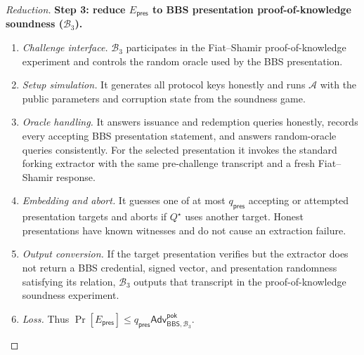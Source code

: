 \documentclass[letterpaper]{article}
\newcommand{\adv}{\mathcal{A}}
\newcommand{\bbs}{\mathsf{BBS}}
\newcommand{\Adv}{\mathsf{Adv}}
\begin{document}
\begin{proof}[Reduction]
\textbf{Step 3: reduce \(E_{\mathsf{pres}}\) to BBS presentation
proof-of-knowledge soundness (\(\mathcal B_3\)).}
\begin{enumerate}
  \item \emph{Challenge interface.} \(\mathcal B_3\) participates in the
  Fiat--Shamir proof-of-knowledge experiment and controls the random oracle
  used by the BBS presentation.
  \item \emph{Setup simulation.} It generates all protocol keys honestly and
  runs \(\adv\) with the public parameters and corruption state from the
  soundness game.
  \item \emph{Oracle handling.} It answers issuance and redemption queries
  honestly, records every accepting BBS presentation statement, and answers
  random-oracle queries consistently. For the selected presentation it invokes
  the standard forking extractor with the same pre-challenge transcript and a
  fresh Fiat--Shamir response.
  \item \emph{Embedding and abort.} It guesses one of at most
  \(q_{\mathsf{pres}}\) accepting or attempted presentation targets and aborts
  if \(Q^\star\) uses another target. Honest presentations have known witnesses
  and do not cause an extraction failure.
  \item \emph{Output conversion.} If the target presentation verifies but the
  extractor does not return a BBS credential, signed vector, and presentation
  randomness satisfying its relation, \(\mathcal B_3\) outputs that transcript
  in the proof-of-knowledge soundness experiment.
  \item \emph{Loss.} Thus
  \(\Pr[E_{\mathsf{pres}}]\le
  q_{\mathsf{pres}}\Adv^{\mathsf{pok}}_{\bbs,\mathcal B_3}\).
\end{enumerate}


\end{proof}
\end{document}
